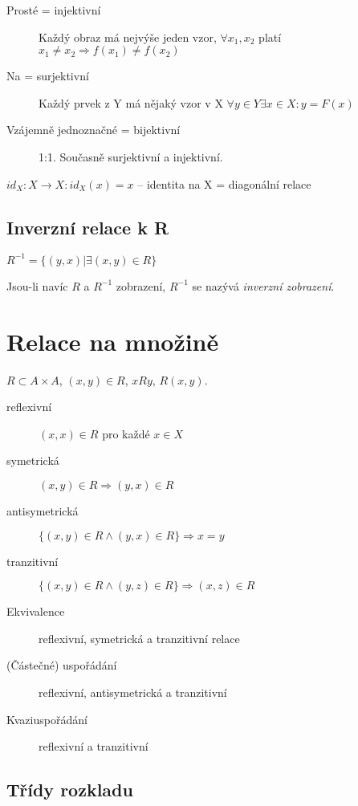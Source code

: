 \documentclass[a4paper, 11pt]{report}
\begin{document}
\begin{description}
	\item[Prosté = injektivní] Každý obraz má nejvýše jeden vzor, $\forall x_1, x_2$ platí $x_1 \neq x_2 \Rightarrow f(x_1) \neq f(x_2)$ 
	\item[Na = surjektivní] Každý prvek z Y má nějaký vzor v X $\forall y \in Y \exists x \in X: y = F(x)$
	\item[Vzájemně jednoznačné = bijektivní] 1:1. Současně surjektivní a injektivní.
\end{description}

$id_X: X \to X: id_X(x) = x$ -- identita na X = diagonální relace

\subsection{Inverzní relace k R}

$R^{-1} = \{ (y,x) | \exists (x,y) \in R\}$

Jsou-li navíc $R$ a $R^{-1}$ zobrazení, $R^{-1}$ se nazývá \emph{inverzní zobrazení}.

\section{Relace na množině}

$R \subset A \times A$, $(x,y) \in R$, $xRy$, $R(x,y)$.

\begin{description}
	\item[reflexivní] $(x,x) \in R$ pro každé $x \in X$
	\item[symetrická] $(x,y) \in R \Rightarrow (y,x) \in R$
	\item[antisymetrická] $\{(x,y) \in R \land (y,x) \in R\} \Rightarrow x = y$
	\item[tranzitivní] $\{(x,y) \in R \land (y,z) \in R\} \Rightarrow (x,z) \in R$
\end{description}

\begin{description}
	\item[Ekvivalence] reflexivní, symetrická a tranzitivní relace
	\item[(Částečné) uspořádání] reflexivní, antisymetrická a tranzitivní
	\item[Kvaziuspořádání] reflexivní a tranzitivní
\end{description}

\subsection{Třídy rozkladu}
\end{document}
